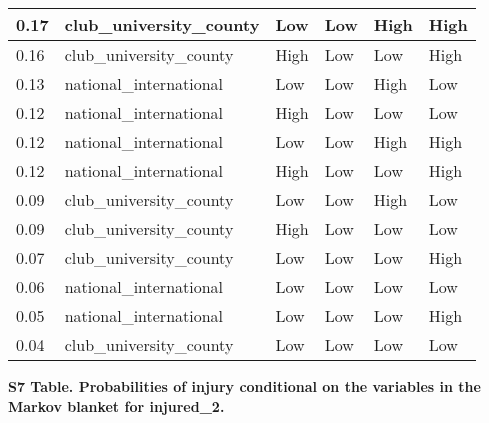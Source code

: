 \documentclass[
]{article}
\begin{document}
\begin{table}[H]
\begin{tabular}[t]{l|l|l|l|l|l}
\hline
0.17 & club\_university\_county & Low & Low & High & High\\
\hline
0.16 & club\_university\_county & High & Low & Low & High\\
\hline
0.13 & national\_international & Low & Low & High & Low\\
\hline
0.12 & national\_international & High & Low & Low & Low\\
\hline
0.12 & national\_international & Low & Low & High & High\\
\hline
0.12 & national\_international & High & Low & Low & High\\
\hline
0.09 & club\_university\_county & Low & Low & High & Low\\
\hline
0.09 & club\_university\_county & High & Low & Low & Low\\
\hline
0.07 & club\_university\_county & Low & Low & Low & High\\
\hline
0.06 & national\_international & Low & Low & Low & Low\\
\hline
0.05 & national\_international & Low & Low & Low & High\\
\hline
0.04 & club\_university\_county & Low & Low & Low & Low\\
\hline
\end{tabular}
\end{table}

\newpage

\textbf{S7 Table. Probabilities of injury conditional on the variables in the Markov blanket for injured\_2.}
\end{document}
